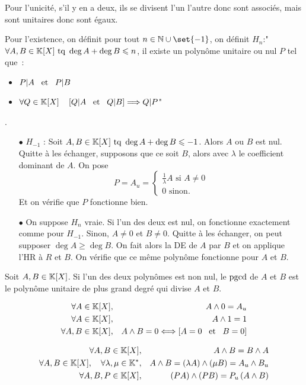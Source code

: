 \documentclass{magnolia}
\begin{document}
\begin{preuve}
Pour l'unicité, s'il y en a deux, ils se divisent l'un l'autre donc sont associés, mais sont unitaires donc sont égaux.

Pour l'existence, on définit pour tout $n\in \N\cup\set{-1}$, on définit $H_n$:"$\forall A,B \in \polyK \text{ tq } \deg A+\deg B\leq n$, il existe un polynôme unitaire ou nul $P$ tel que~:
\begin{itemize}
\item $P|A \quad\!\text{et}\quad\! P|B$
\item $\forall Q\in\polyK \quad \cro{Q|A \et Q|B} \implique Q|P$"
\end{itemize}.
\begin{itemize}
\item[$\bullet$] $H_{-1}$ : Soit $A,B \in \polyK \text{ tq } \deg A+\deg B\leq -1$. Alors $A$ ou $B$ est nul. Quitte à les échanger, supposons que ce soit $B$, alors avec $\lambda$ le coefficient dominant de $A$. On pose $$P=A_u=\begin{cases}\frac{1}{\lambda}A \text{ si } A\neq 0\\
0 \text{ sinon.}\end{cases}$$
Et on vérifie que $P$ fonctionne bien.
\item[$\bullet$] On suppose $H_n$ vraie. Si l'un des deux est nul, on fonctionne exactement comme pour $H_{-1}$. Sinon, $A\neq 0$ et $B\neq 0$. Quitte à les échanger, on peut supposer $\deg A\geq \deg B$. On fait alors la DE de $A$ par $B$ et on applique l'HR à $R$ et $B$. On vérifie que ce même polynôme fonctionne pour $A$ et $B$.
\end{itemize}
\end{preuve}

\begin{remarqueUnique}
\remarque Soit $A, B\in\polyK$. Si l'un des deux polynômes est non nul, le $\operatorname{pgcd}$ de $A$ et $B$ est le polynôme unitaire de plus grand degré qui divise $A$ et $B$.
\end{remarqueUnique}

\begin{proposition}
\begin{eqnarray*}
\forall A\in\polyK, & & A\wedge 0=A_u\\
\forall A\in\polyK, & & A\wedge 1=1\\
\forall A,B\in\polyK, & & A\wedge B=0 \ssi \cro{A=0 \et B=0}
\end{eqnarray*}
\end{proposition}

\begin{proposition}
\begin{eqnarray*}
\forall A,B\in\polyK, & & A\wedge B=B\wedge A\\
\forall A,B\in\polyK \qsep \forall\lambda,\mu\in\Ks,& &
  A\wedge B=\p{\lambda A}\wedge\p{\mu B}=A_u\wedge B_u\\
\forall A,B,P\in\polyK, & & \p{PA}\wedge\p{PB}=P_u\p{A\wedge B}\\
\end{eqnarray*}
\end{proposition}
\end{document}

